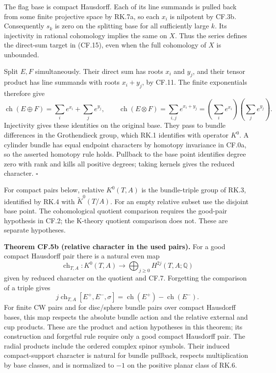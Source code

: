 \documentclass[
  11pt,
]{article}
\begin{document}
The flag base is compact Hausdorff. Each of its line summands is pulled
back from some finite projective space by RK.7a, so each \(x_i\) is
nilpotent by CF.3b. Consequently \(s_k\) is zero on the splitting base
for all sufficiently large \(k\). Its injectivity in rational cohomology
implies the same on \(X\). Thus the series defines the direct-sum target
in (CF.15), even when the full cohomology of \(X\) is unbounded.

Split \(E,F\) simultaneously. Their direct sum has roots \(x_i\) and
\(y_j\), and their tensor product has line summands with roots
\(x_i+y_j\), by CF.11. The finite exponentials therefore give \[
\operatorname{ch}(E\oplus F)=\sum_i e^{x_i}+\sum_j e^{y_j},\qquad
\operatorname{ch}(E\otimes F)=\sum_{i,j}e^{x_i+y_j}
=\left(\sum_i e^{x_i}\right)\left(\sum_j e^{y_j}\right).
\] Injectivity gives these identities on the original base. They pass to
bundle differences in the Grothendieck group, which RK.1 identifies with
operator \(K^0\). A cylinder bundle has equal endpoint characters by
homotopy invariance in CF.0a, so the asserted homotopy rule holds.
Pullback to the base point identifies degree zero with rank and kills
all positive degrees; taking kernels gives the reduced character.
\(\square\)

For compact pairs below, relative \(K^0(T,A)\) is the bundle-triple
group of RK.3, identified by RK.4 with \(\widetilde K^0(T/A)\). For an
empty relative subset use the disjoint base point. The cohomological
quotient comparison requires the good-pair hypothesis in CF.2; the
K-theory quotient comparison does not. These are separate hypotheses.

\textbf{Theorem CF.5b (relative character in the used pairs).} For a
good compact Hausdorff pair there is a natural even map \[
\operatorname{ch}_{T,A}:K^0(T,A)\longrightarrow
\bigoplus_{j\geq0}H^{2j}(T,A;\mathbb Q)
\tag{CF.17}
\] given by reduced character on the quotient and CF.7. Forgetting the
comparison of a triple gives \[
j\operatorname{ch}_{T,A}[E^+,E^-,\sigma]
=\operatorname{ch}(E^+)-\operatorname{ch}(E^-).
\tag{CF.18}
\] For finite CW pairs and for disc/sphere bundle pairs over compact
Hausdorff bases, this map respects the absolute bundle action and the
relative external and cup products. These are the product and action
hypotheses in this theorem; its construction and forgetful rule require
only a good compact Hausdorff pair. The radial products include the
ordered complex spinor symbols. Their induced compact-support character
is natural for bundle pullback, respects multiplication by base classes,
and is normalized to \(-1\) on the positive planar class of RK.6.
\end{document}
